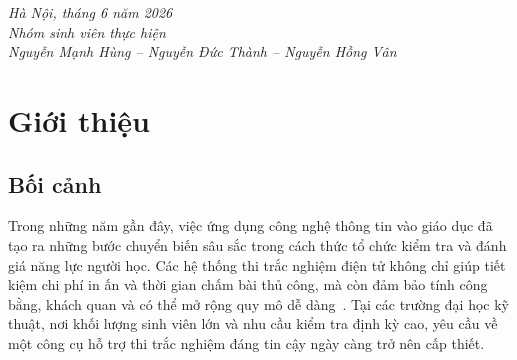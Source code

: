 \documentclass[11pt]{report}
\makeatletter
\let\ps@plain\ps@fancy
\makeatother
\begin{document}
\vspace{24pt}
\begin{flushright}
    \textit{Hà Nội, tháng 6 năm 2026} \\[6pt]
    \textit{Nhóm sinh viên thực hiện} \\[4pt]
    \textit{Nguyễn Mạnh Hùng -- Nguyễn Đức Thành -- Nguyễn Hồng Vân}
\end{flushright}

\clearpage
\makeatletter
\let\ps@plain\ps@empty
\makeatother
{}
\listoffigures
\makeatletter
\let\ps@plain\ps@empty
\makeatother
\clearpage

\clearpage
\makeatletter
\let\ps@plain\ps@empty
\makeatother
{}
\listoftables
\makeatletter
\let\ps@plain\ps@empty
\makeatother
\clearpage

\clearpage
\makeatletter
\let\ps@plain\ps@empty
\makeatother
\pagestyle{empty}
\tableofcontents
\thispagestyle{empty}
\makeatletter
\let\ps@plain\ps@fancy
\makeatother
\clearpage

\pagestyle{fancy}

\newpage
\chapter{Giới thiệu}
\label{chap:gioithieu}

\section{Bối cảnh}

Trong những năm gần đây, việc ứng dụng công nghệ thông tin vào giáo dục đã tạo ra những bước chuyển biến sâu sắc trong cách thức tổ chức kiểm tra và đánh giá năng lực người học. Các hệ thống thi trắc nghiệm điện tử không chỉ giúp tiết kiệm chi phí in ấn và thời gian chấm bài thủ công, mà còn đảm bảo tính công bằng, khách quan và có thể mở rộng quy mô dễ dàng~\cite{guralnick2015}. Tại các trường đại học kỹ thuật, nơi khối lượng sinh viên lớn và nhu cầu kiểm tra định kỳ cao, yêu cầu về một công cụ hỗ trợ thi trắc nghiệm đáng tin cậy ngày càng trở nên cấp thiết.
\end{document}
